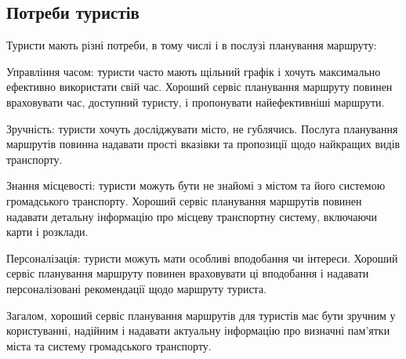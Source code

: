 \subsection{Потреби туристів}
\label{subsec:tourists-needs-subsection}

Туристи мають різні потреби, в тому числі і в послузі планування маршруту:

Управління часом: туристи часто мають щільний графік і хочуть максимально ефективно використати свій час. Хороший сервіс планування маршруту повинен враховувати час, доступний туристу, і пропонувати найефективніші маршрути.

Зручність: туристи хочуть досліджувати місто, не гублячись. Послуга планування маршрутів повинна надавати прості вказівки та пропозиції щодо найкращих видів транспорту.

Знання місцевості: туристи можуть бути не знайомі з містом та його системою громадського транспорту. Хороший сервіс планування маршрутів повинен надавати детальну інформацію про місцеву транспортну систему, включаючи карти і розклади.

Персоналізація: туристи можуть мати особливі вподобання чи інтереси. Хороший сервіс планування маршруту повинен враховувати ці вподобання і надавати персоналізовані рекомендації щодо маршруту туриста.

Загалом, хороший сервіс планування маршрутів для туристів має бути зручним у користуванні, надійним і надавати актуальну інформацію про визначні пам'ятки міста та систему громадського транспорту.